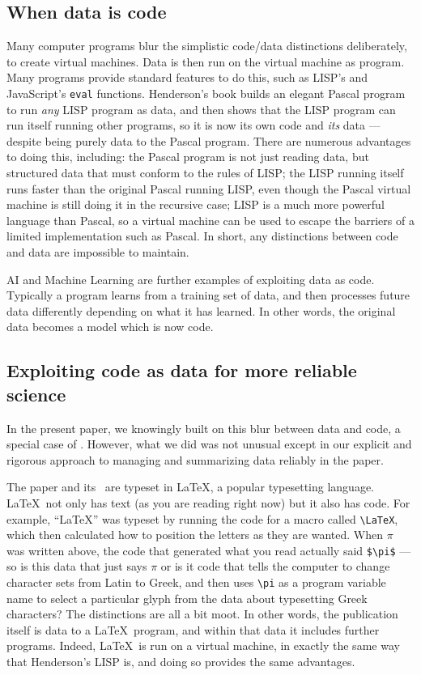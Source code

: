 \documentclass[10pt,a4paper]{article}
\begin{document}
\subsection{When data is code}
{Many computer programs blur the simplistic code/data distinctions deliberately, to create virtual machines. Data is then run on the virtual machine as program. Many programs provide standard features to do this, such as LISP's and JavaScript's \texttt{eval} functions. Henderson's book \cite{henderson} builds an elegant Pascal program to run \emph{any\/} LISP program as data, and then shows that the LISP program can run itself running other programs, so it is now its own code and \emph{its\/} data --- despite being purely data to the Pascal program. There are numerous advantages to doing this, including: the Pascal program is not just reading data, but structured data that must conform to the rules of LISP; the LISP running itself runs faster than the original Pascal running LISP, even though the Pascal virtual machine is still doing it in the recursive case; LISP is a much more powerful language than Pascal, so a virtual machine can be used to escape the barriers of a limited implementation such as Pascal. In short, any distinctions between code and data are impossible to maintain.}

AI and Machine Learning are further examples of exploiting data as code. Typically a program learns from a training set of data, and then processes future data differently depending on what it has learned. In other words, the original data becomes a model which is now code.

\subsection{Exploiting code as data for more reliable science}
In the present paper, we knowingly built on this blur between data and code, a special case of \RAPstarp. However, what we did was not unusual except in our explicit and rigorous approach to managing and summarizing data reliably in the paper.

The paper and its \supplement\ are typeset in \LaTeX, a popular typesetting language. \LaTeX\ not only has text (as you are reading right now) but it also has code. For example, ``\LaTeX'' was typeset by running the code for a macro called \verb|\LaTeX|, which then calculated how to position the letters as they are wanted. When $\pi$ was written above, the code that generated what you read actually said \verb|$\pi$| --- so is this data that just says $\pi$ or is it code that tells the computer to change character sets from Latin to Greek, and then uses \verb|\pi| as a program variable name to select a particular glyph from the data about typesetting Greek characters? The distinctions are all a bit moot. In other words, the publication itself is data to a \LaTeX\ program, and within that data it includes further programs. Indeed, \LaTeX\ is run on a virtual machine, in exactly the same way that Henderson's LISP is, and doing so provides the same advantages.
\end{document}

